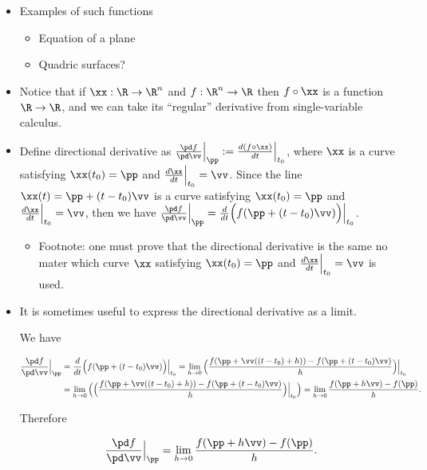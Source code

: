 \begin{itemize}
    \item Examples of such functions
    \begin{itemize}
        \item Equation of a plane
        \item Quadric surfaces?
    \end{itemize}
    
    \item Notice that if $\xx:\R \rightarrow \R^n$ and $f:\R^n \rightarrow \R$ then $f \circ \xx$ is a function $\R 
    \rightarrow \R$, and we can take its ``regular'' derivative from single-variable calculus.

    \item Define directional derivative as $\frac{\pd f}{\pd \vv} \Big|_\pp := \frac{d (f \circ \xx)}{dt}\Big|_{t_0}$, where $\xx$ is a curve satisfying $\xx(t_0) = \pp$ and $\frac{d\xx}{dt}\Big|_{t_0} = \vv$. Since the line $\xx(t) = \pp + (t - t_0) \vv$ is a curve satisfying $\xx(t_0) = \pp$ and $\frac{d\xx}{dt}\Big|_{t_0} = \vv$, then we have $\frac{\pd f}{\pd \vv} \Big|_\pp = \frac{d}{dt}\Big(f(\pp + (t - t_0) \vv) \Big)\Big|_{t_0}$.
    \begin{itemize}
        \item Footnote: one must prove that the directional derivative is the same no mater which curve $\xx$ satisfying $\xx(t_0) = \pp$ and $\frac{d\xx}{dt}\Big|_{t_0} = \vv$ is used.
    \end{itemize}
    
    \item It is sometimes useful to express the directional derivative as a limit. 
        
        We have
        
        \begin{align*}
            \frac{\pd f}{\pd \vv}\Big|_\pp 
            &= \frac{d}{dt}\Big(f(\pp + (t - t_0)\vv)\Big)\Big|_{t_0}
            = \lim_{h \rightarrow 0} \Big( \frac{f(\pp + \vv((t - t_0) + h)) - f(\pp + (t - t_0)\vv)}{h} \Big) \Big|_{t_0} \\
            &= \lim_{h \rightarrow 0} \Big( \Big( \frac{f(\pp + \vv((t - t_0) + h)) - f(\pp + (t - t_0)\vv)}{h} \Big) \Big|_{t_0} \Big)
            = \lim_{h \rightarrow 0} \frac{f(\pp + h\vv) - f(\pp)}{h}.
        \end{align*}
        
        Therefore
        
        \begin{align*}
            \frac{\pd f}{\pd \vv}\Big|_\pp = \lim_{h \rightarrow 0} \frac{f(\pp + h\vv) - f(\pp)}{h}.
        \end{align*}
        

\end{itemize}
